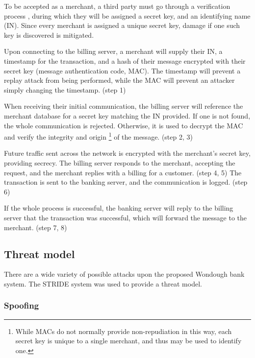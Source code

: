 To be accepted as a merchant, a third party must go through a verification process , during which they will be assigned a secret key, and an identifying name (IN). Since every merchant is assigned a unique secret key, damage if one such key is discovered is mitigated.

Upon connecting to the billing server, a merchant will supply their IN, a timestamp for the transaction, and a hash of their message encrypted with their secret key (message authentication code, MAC). The timestamp will prevent a replay attack from being performed, while the MAC will prevent an attacker simply changing the timestamp. (step 1)

When receiving their initial communication, the billing server will reference the merchant database for a secret key matching the IN provided. If one is not found, the whole communication is rejected. Otherwise, it is used to decrypt the MAC and verify the integrity and origin \footnote{
    While MACs do not normally provide non-repudiation in this way, each secret key is unique to a single merchant, and thus may be used to identify one. 
} of the message. (step 2, 3)

Future traffic sent across the network is encrypted with the merchant’s secret key, providing secrecy. The billing server responds to the merchant, accepting the request, and the merchant replies with a billing for a customer. (step 4, 5) The transaction is sent to the banking server, and the communication is logged. (step 6)

If the whole process is successful, the banking server will reply to the billing server that the transaction was successful, which will forward the message to the merchant. (step 7, 8)

\subsection{Threat model}

There are a wide variety of possible attacks upon the proposed Wondough bank system. The STRIDE system was used to provide a threat model.

\subsubsection{Spoofing}

